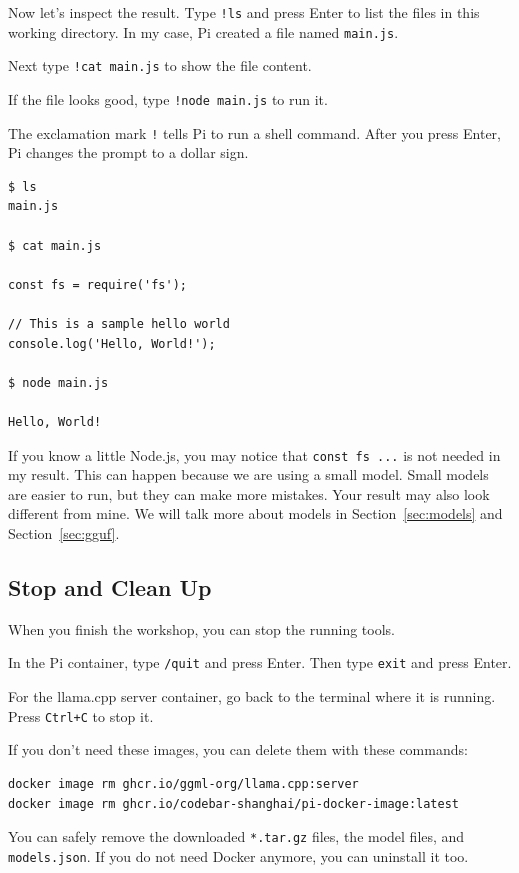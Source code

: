 \documentclass[a4paper,12pt]{article}
\begin{document}
Now let's inspect the result. Type \verb|!ls| and press Enter to list the files in this working directory. In my case, Pi created a file named \texttt{main.js}.

Next type \verb|!cat main.js| to show the file content.

If the file looks good, type \verb|!node main.js| to run it.

The exclamation mark \texttt{!} tells Pi to run a shell command. After you press Enter, Pi changes the prompt to a dollar sign.

\begin{verbatim}
$ ls
main.js

$ cat main.js

const fs = require('fs');

// This is a sample hello world
console.log('Hello, World!');

$ node main.js

Hello, World!
\end{verbatim}

If you know a little Node.js, you may notice that \texttt{const fs ...} is not needed in my result. This can happen because we are using a small model. Small models are easier to run, but they can make more mistakes. Your result may also look different from mine. We will talk more about models in Section~\ref{sec:models} and Section~\ref{sec:gguf}.

\subsection{Stop and Clean Up}

When you finish the workshop, you can stop the running tools.

In the Pi container, type \verb|/quit| and press Enter. Then type \verb|exit| and press Enter.

For the llama.cpp server container, go back to the terminal where it is running. Press \texttt{Ctrl+C} to stop it.

If you don't need these images, you can delete them with these commands:

\begin{verbatim}
docker image rm ghcr.io/ggml-org/llama.cpp:server
docker image rm ghcr.io/codebar-shanghai/pi-docker-image:latest
\end{verbatim}

You can safely remove the downloaded \texttt{*.tar.gz} files, the model files, and \texttt{models.json}. If you do not need Docker anymore, you can uninstall it too.
\end{document}
